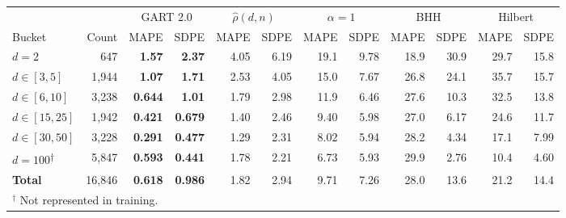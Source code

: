 \begin{tabular}{@{}lrrrrrrrrrrr@{}}
\toprule
 & & \multicolumn{2}{c}{GART 2.0} & \multicolumn{2}{c}{$\hat\rho(d,n)$} & \multicolumn{2}{c}{$\alpha=1$} & \multicolumn{2}{c}{BHH} & \multicolumn{2}{c}{Hilbert} \\
\cmidrule(lr){3-4}\cmidrule(lr){5-6}\cmidrule(lr){7-8}\cmidrule(lr){9-10}\cmidrule(lr){11-12}
Bucket & Count & MAPE & SDPE & MAPE & SDPE & MAPE & SDPE & MAPE & SDPE & MAPE & SDPE \\
\midrule
$d=2$ & 647 & \textbf{1.57} & \textbf{2.37} & 4.05 & 6.19 & 19.1 & 9.78 & 18.9 & 30.9 & 29.7 & 15.8 \\
$d\in[3,5]$ & 1{,}944 & \textbf{1.07} & \textbf{1.71} & 2.53 & 4.05 & 15.0 & 7.67 & 26.8 & 24.1 & 35.7 & 15.7 \\
$d\in[6,10]$ & 3{,}238 & \textbf{0.644} & \textbf{1.01} & 1.79 & 2.98 & 11.9 & 6.46 & 27.6 & 10.3 & 32.5 & 13.8 \\
$d\in[15,25]$ & 1{,}942 & \textbf{0.421} & \textbf{0.679} & 1.40 & 2.46 & 9.40 & 5.98 & 27.0 & 6.17 & 24.6 & 11.7 \\
$d\in[30,50]$ & 3{,}228 & \textbf{0.291} & \textbf{0.477} & 1.29 & 2.31 & 8.02 & 5.94 & 28.2 & 4.34 & 17.1 & 7.99 \\
$d=100$\textsuperscript{$\dagger$} & 5{,}847 & \textbf{0.593} & \textbf{0.441} & 1.78 & 2.21 & 6.73 & 5.93 & 29.9 & 2.76 & 10.4 & 4.60 \\
\textbf{Total} & 16{,}846 & \textbf{0.618} & \textbf{0.986} & 1.82 & 2.94 & 9.71 & 7.26 & 28.0 & 13.6 & 21.2 & 14.4 \\
\bottomrule
\multicolumn{12}{l}{\footnotesize $^{\dagger}$ Not represented in training.} \\
\end{tabular}
